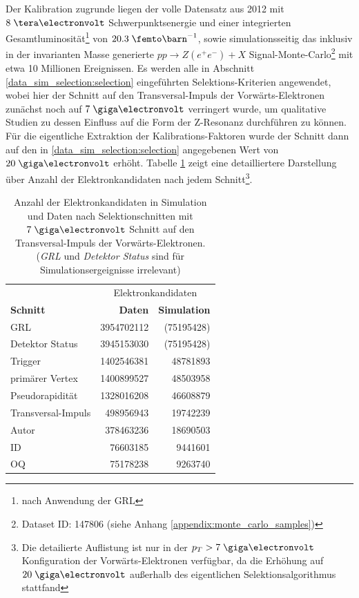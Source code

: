 Der Kalibration zugrunde liegen der volle Datensatz aus 2012 mit $8\TeV$
Schwer\-punktsenergie und einer integrierten Gesamtluminosität\footnote{nach
Anwendung der \ac{GRL}} von $20.3\fb^{-1}$, sowie simulationsseitig das
inklusiv in der invarianten Masse generierte $pp\rightarrow Z(e^+e^-) +X$
Signal-Monte-Carlo\footnote{Dataset ID: 147806 (siehe Anhang
\ref{appendix:monte_carlo_samples})} mit etwa 10 Millionen
Ereignissen. Es werden alle in Abschnitt \ref{data_sim_selection:selection}
eingeführten Selektions-Kriterien
angewendet, wobei hier der Schnitt auf den Transversal-Impuls der
Vorwärts-Elektronen zunächst noch auf $7\GeV$ verringert wurde, um qualitative
Studien zu dessen Einfluss auf die Form der Z-Resonanz durchführen zu können.
Für die eigentliche Extraktion der Kalibrations-Faktoren wurde der Schnitt dann
auf den in \ref{data_sim_selection:selection} angegebenen Wert von $20\GeV$
erhöht. Tabelle \ref{tab:remaining_electrons} zeigt eine detailliertere
Darstellung über Anzahl der Elektronkandidaten nach jedem Schnitt\footnote{Die
detailierte Auflistung ist nur in der $p_T > 7\GeV$ Konfiguration der
Vorwärts-Elektronen verfügbar, da die Erhöhung auf $20\GeV$ außerhalb des
eigentlichen Selektionsalgorithmus stattfand}.

\begin{table}[h]
    \centering
    \begin{tabular}{|l|r|r|}
        \hline
        & \multicolumn{2}{|c|}{Elektronkandidaten} \\
        \textbf{Schnitt} & \textbf{Daten} & \textbf{Simulation} \\
        \hline\hline
        \ac{GRL}           & 3954702112 & (75195428) \\
        Detektor Status    & 3945153030 & (75195428) \\
        Trigger            & 1402546381 & 48781893 \\
        primärer Vertex    & 1400899527 & 48503958 \\
        Pseudorapidität    & 1328016208 & 46608879 \\
        Transversal-Impuls &  498956943 & 19742239 \\
        Autor              &  378463236 & 18690503 \\
        ID                 &   76603185 &  9441601 \\
        OQ                 &   75178238 &  9263740 \\
        \hline
    \end{tabular}
    \caption[Anzahl der Elektronkandidaten in Simulation und Daten nach
        Selektionschnitten]
        {Anzahl der Elektronkandidaten in Simulation und Daten nach
        Selektionschnitten mit $7\GeV$ Schnitt auf den Transversal-Impuls der
        Vorwärts-Elektronen. (\textit{\ac{GRL}} und \textit{Detektor Status}
        sind für Simulationsergeignisse irrelevant)}
    \label{tab:remaining_electrons}
\end{table}

